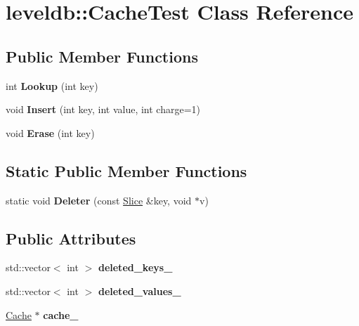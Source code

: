 \hypertarget{classleveldb_1_1_cache_test}{}\section{leveldb\+::Cache\+Test Class Reference}
\label{classleveldb_1_1_cache_test}
\subsection*{Public Member Functions}
\begin{DoxyCompactItemize}
\item 
\mbox{\label{classleveldb_1_1_cache_test_a90d19cd6098f10f809f0c3b94e8b3fc6}} 
int {\bfseries Lookup} (int key)
\item 
\mbox{\label{classleveldb_1_1_cache_test_ad7fc76253a92137e62aede17322c7286}} 
void {\bfseries Insert} (int key, int value, int charge=1)
\item 
\mbox{\label{classleveldb_1_1_cache_test_aeaa81bbd9d0fba1fb31b0a8f7aa94397}} 
void {\bfseries Erase} (int key)
\end{DoxyCompactItemize}
\subsection*{Static Public Member Functions}
\begin{DoxyCompactItemize}
\item 
\mbox{\label{classleveldb_1_1_cache_test_aa8d3ce31a1995da33810f2b5320089ab}} 
static void {\bfseries Deleter} (const \mbox{\hyperlink{classleveldb_1_1_slice}{Slice}} \&key, void $\ast$v)
\end{DoxyCompactItemize}
\subsection*{Public Attributes}
\begin{DoxyCompactItemize}
\item 
\mbox{\label{classleveldb_1_1_cache_test_aad6b825748f29b973a8934682eb50ed2}} 
std\+::vector$<$ int $>$ {\bfseries deleted\+\_\+keys\+\_\+}
\item 
\mbox{\label{classleveldb_1_1_cache_test_add979edecc72f9740b1d6d4951c13c02}} 
std\+::vector$<$ int $>$ {\bfseries deleted\+\_\+values\+\_\+}
\item 
\mbox{\label{classleveldb_1_1_cache_test_af2edcc8a47148050ba791f6a2b7a6165}} 
\mbox{\hyperlink{classleveldb_1_1_cache}{Cache}} $\ast$ {\bfseries cache\+\_\+}
\end{DoxyCompactItemize}
